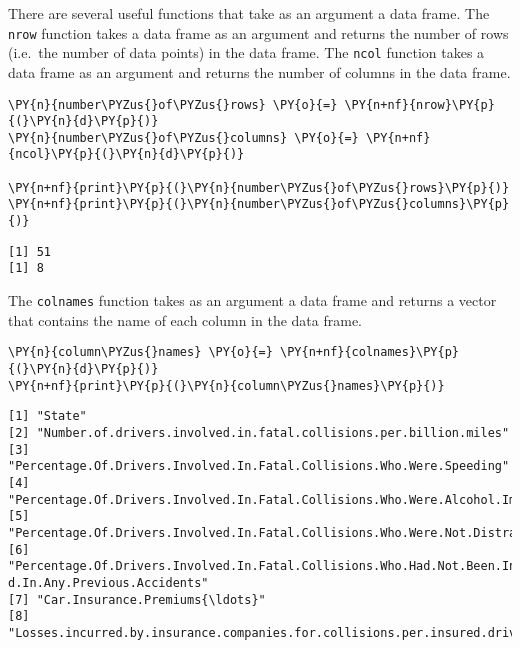 There are several useful functions that take as an argument a data
frame. The \texttt{nrow} function takes a data frame as an argument and
returns the number of rows (i.e.~the number of data points) in the data
frame. The \texttt{ncol} function takes a data frame as an argument and
returns the number of columns in the data frame.

    \begin{tcolorbox}[breakable, size=fbox, boxrule=1pt, pad at break*=1mm,colback=cellbackground, colframe=cellborder]
\begin{Verbatim}[commandchars=\\\{\}]
\PY{n}{number\PYZus{}of\PYZus{}rows} \PY{o}{=} \PY{n+nf}{nrow}\PY{p}{(}\PY{n}{d}\PY{p}{)}
\PY{n}{number\PYZus{}of\PYZus{}columns} \PY{o}{=} \PY{n+nf}{ncol}\PY{p}{(}\PY{n}{d}\PY{p}{)}

\PY{n+nf}{print}\PY{p}{(}\PY{n}{number\PYZus{}of\PYZus{}rows}\PY{p}{)}
\PY{n+nf}{print}\PY{p}{(}\PY{n}{number\PYZus{}of\PYZus{}columns}\PY{p}{)}
\end{Verbatim}
\end{tcolorbox}

    \begin{Verbatim}[commandchars=\\\{\}]
[1] 51
[1] 8
    \end{Verbatim}

    The \texttt{colnames} function takes as an argument a data frame and
returns a vector that contains the name of each column in the data
frame.

    \begin{tcolorbox}[breakable, size=fbox, boxrule=1pt, pad at break*=1mm,colback=cellbackground, colframe=cellborder]
\begin{Verbatim}[commandchars=\\\{\}]
\PY{n}{column\PYZus{}names} \PY{o}{=} \PY{n+nf}{colnames}\PY{p}{(}\PY{n}{d}\PY{p}{)}
\PY{n+nf}{print}\PY{p}{(}\PY{n}{column\PYZus{}names}\PY{p}{)}
\end{Verbatim}
\end{tcolorbox}

    \begin{Verbatim}[commandchars=\\\{\}]
[1] "State"
[2] "Number.of.drivers.involved.in.fatal.collisions.per.billion.miles"
[3] "Percentage.Of.Drivers.Involved.In.Fatal.Collisions.Who.Were.Speeding"
[4]
"Percentage.Of.Drivers.Involved.In.Fatal.Collisions.Who.Were.Alcohol.Impaired"
[5] "Percentage.Of.Drivers.Involved.In.Fatal.Collisions.Who.Were.Not.Distracted"
[6] "Percentage.Of.Drivers.Involved.In.Fatal.Collisions.Who.Had.Not.Been.Involve
d.In.Any.Previous.Accidents"
[7] "Car.Insurance.Premiums{\ldots}"
[8]
"Losses.incurred.by.insurance.companies.for.collisions.per.insured.driver{\ldots}"
    \end{Verbatim}

